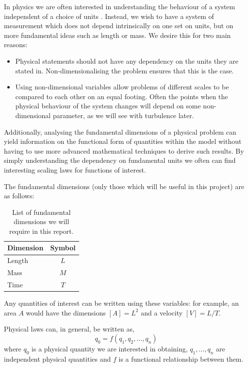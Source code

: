 In physics we are often interested in understanding the behaviour of a system independent of a
choice of units \citet{0143-0807-31-4-019}. Instead, we wish to
have a system of measurement which does not depend intrinsically on one set on units, but on more 
fundamental ideas such as length or mass. We desire this for two main reasons:
\begin{itemize}
	\item Physical statements should not have any dependency on the units they are stated in.
	Non-dimensionalising the problem ensures that this is the case.
	\item Using non-dimensional variables allow problems of different scales to be compared to each 
	other on an equal footing. Often the points when the physical behaviour of the system changes 
	will depend on some non-dimensional parameter, as we will see with turbulence later.
\end{itemize}

Additionally, analysing the fundamental dimensions of a physical problem can yield information on the
functional form of quantities within the model without having to use more advanced mathematical
techniques to derive such results. By simply understanding the dependency on fundamental units we
often can find interesting scaling laws for functions of interest.

The fundamental dimensions (only those which will be useful in this project) are as follows:
\begin{table}[h]
\centering
\begin{tabular}{l c}
Dimension & Symbol \\
\hline
Length & $L$ \\
Mass & $M$ \\
Time & $T$
\end{tabular}
\caption[List of fundamental dimensions]{List of fundamental dimensions we will require in this report.}
\end{table}

Any quantities of interest can be written using these variables: for example, an area $A$ would have 
the dimensions $[A] = L^2$ and a velocity $[V] = L/T$.

Physical laws can, in general, be written as, \citet{0143-0807-31-4-019}
\begin{equation} \label{functional}
q_{0} = f(q_1,q_2,\ldots,q_n)
\end{equation}
where $q_0$ is a physical quantity we are interested in obtaining, $q_1,\ldots,q_n$ are independent
physical quantities and $f$ is a functional relationship between them.

